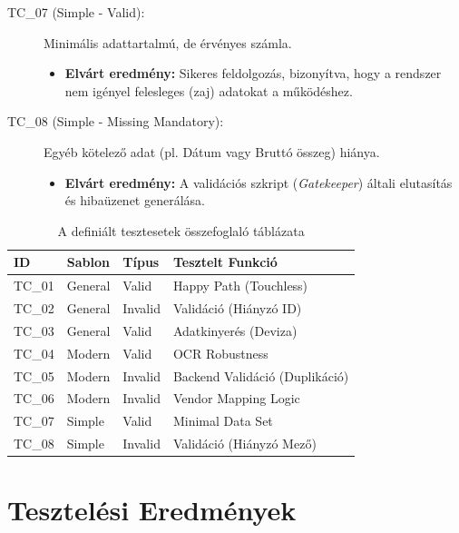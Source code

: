 \begin{description}
    \item[TC\_07 (Simple - Valid):] Minimális adattartalmú, de érvényes számla.
    \begin{itemize}
        \item \textbf{Elvárt eredmény:} Sikeres feldolgozás, bizonyítva, hogy a rendszer nem igényel felesleges (zaj) adatokat a működéshez.
    \end{itemize}
    
    \item[TC\_08 (Simple - Missing Mandatory):] Egyéb kötelező adat (pl. Dátum vagy Bruttó összeg) hiánya.
    \begin{itemize}
        \item \textbf{Elvárt eredmény:} A validációs szkript (\textit{Gatekeeper}) általi elutasítás és hibaüzenet generálása.
    \end{itemize}
\end{description}

\begin{table}[H]
    \centering
    \begin{tabular}{|l|l|l|l|}
        \hline
        \textbf{ID} & \textbf{Sablon} & \textbf{Típus} & \textbf{Tesztelt Funkció} \\ \hline
        TC\_01 & General & Valid & Happy Path (Touchless) \\ \hline
        TC\_02 & General & Invalid & Validáció (Hiányzó ID) \\ \hline
        TC\_03 & General & Valid & Adatkinyerés (Deviza) \\ \hline
        TC\_04 & Modern & Valid & OCR Robustness \\ \hline
        TC\_05 & Modern & Invalid & Backend Validáció (Duplikáció) \\ \hline
        TC\_06 & Modern & Invalid & Vendor Mapping Logic \\ \hline
        TC\_07 & Simple & Valid & Minimal Data Set \\ \hline
        TC\_08 & Simple & Invalid & Validáció (Hiányzó Mező) \\ \hline
    \end{tabular}
    \caption{A definiált tesztesetek összefoglaló táblázata}
    \label{tab:test_cases_summary}
\end{table}


\section{Tesztelési Eredmények}
\label{sec:eval_results}

